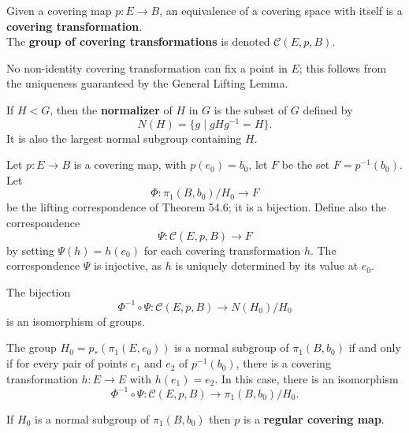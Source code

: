 \begin{definition}
Given a covering map $p\colon E \rightarrow B$, an equivalence of a covering space with itself is a \textbf{covering transformation}. \\

The \textbf{group of covering transformations} is denoted $\mathcal{C}(E, p, B)$.
\end{definition}

\begin{remark}
    No non-identity covering transformation can fix a point in $E$; this follows from the uniqueness guaranteed by the General Lifting Lemma. 
\end{remark}

\begin{definition}[Normalizer]
If $H < G$, then the \textbf{normalizer} of $H$ in $G$ is the subset of $G$ defined by
\[
    N(H) = \{ g \mid gHg^{-1} = H \}. 
\]
It is also the largest normal subgroup containing $H$.
\end{definition}

\begin{definition}
Let $p\colon E \rightarrow B$ is a covering map, with $p(e_0) = b_0$, let $F$ be the set $F = p^{-1}(b_0)$. Let
\[
    \Phi \colon \pi_1(B, b_0) / H_0 \rightarrow F
\]
be the lifting correspondence of Theorem 54.6; it is a bijection. Define also the correspondence
\[
    \Psi \colon \mathcal{C}(E, p, B) \rightarrow  F
\]
by setting $\Psi (h) = h(e_0)$ for each covering transformation $h$. The correspondence $\Psi$ is injective, as $h$ is uniquely determined by its value at $e_0$.
\end{definition}

\begin{theorem*}[81.2]
The bijection
\[
    \Phi^{-1} \circ \Psi \colon \mathcal{C}(E, p, B) \rightarrow N(H_0) / H_0
\]
is an isomorphism of groups.
\end{theorem*}

\begin{corollary}
The group $H_0 = p_{\ast}(\pi_1(E, e_0))$ is a normal subgroup of $\pi_1(B, b_0)$ if and only if for every pair of points $e_1$ and $e_2$ of $p^{-1}(b_0)$,
there is a covering transformation $h \colon E \rightarrow E$ with $h(e_1) = e_2$. In this case, there is an isomorphism
\[
    \Phi^{-1} \circ \Psi \colon \mathcal{C}(E, p, B) \rightarrow \pi_1(B, b_0) / H_0.
\] 
\end{corollary}

\begin{definition}
If $H_0$ is a normal subgroup of $\pi_1(B, b_0)$ then $p$ is a \textbf{regular covering map}.
\end{definition}

